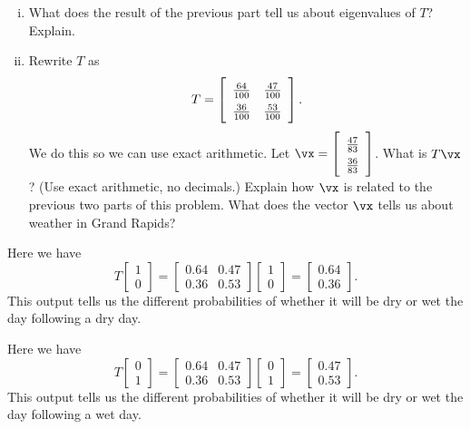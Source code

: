 \begin{example}
\begin{enumerate}[i.]
	\item What does the result of the previous part tell us about eigenvalues of $T$? Explain. 
	
	\item Rewrite $T$ as 
	\[T = \left[ \renewcommand{\arraystretch}{1.4} \begin{array}{cc} \frac{64}{100}&\frac{47}{100} \\ \frac{36}{100}&\frac{53}{100} \end{array} \right].\]
	 We do this so we can use exact arithmetic. Let $\vx = \left[ \renewcommand{\arraystretch}{1.4} \begin{array}{c} \frac{47}{83} \\ \frac{36}{83} \end{array} \right]$. What is $T\vx$? (Use exact arithmetic, no decimals.) Explain how $\vx$ is related to the previous two parts of this problem. What does the vector $\vx$ tells us about weather in Grand Rapids? 
	
	\end{enumerate}


\ea
	
\ExampleSolution
\ba
\item Here we have 
\[T\left[ \begin{array}{c} 1\\0 \end{array}\right]  = \left[ \begin{array}{cc} 0.64&0.47 \\ 0.36&0.53 \end{array} \right] \left[ \begin{array}{c} 1\\0 \end{array}\right]  = \left[ \begin{array}{c} 0.64\\0.36 \end{array}\right].\]
This output tells us the different probabilities of whether it will be dry or wet the day following a dry day. 



\item Here we have 
\[T\left[ \begin{array}{c} 0\\1 \end{array}\right]  = \left[ \begin{array}{cc} 0.64&0.47 \\ 0.36&0.53 \end{array} \right] \left[ \begin{array}{c} 0\\1 \end{array}\right]  = \left[ \begin{array}{c} 0.47\\0.53 \end{array}\right].\]
This output tells us the different probabilities of whether it will be dry or wet the day following a wet day. 



\end{example}
